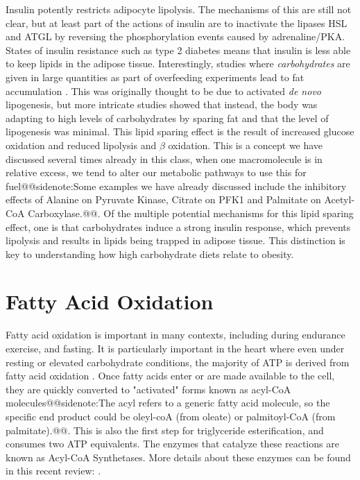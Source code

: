 \documentclass{tufte-handout}
\makeatletter
\def\sidenote#1{@@sidenote:#1@@}
\makeatother
\begin{document}
Insulin potently restricts adipocyte lipolysis.  The mechanisms of this are still not clear, but at least part of the actions of insulin are to inactivate the lipases HSL and ATGL by reversing the phosphorylation events caused by adrenaline/PKA.   States of insulin resistance such as type 2 diabetes means that insulin is less able to keep lipids in the adipose tissue.  Interestingly, studies where \emph{carbohydrates} are given in large quantities as part of overfeeding experiments lead to fat accumulation \citep{Acheson1988}.  This was originally thought to be due to activated \textit{de novo} lipogenesis, but more intricate studies showed that instead, the body was adapting to high levels of carbohydrates by sparing fat \citep{McDevitt2001} and that the level of lipogenesis was minimal.  This lipid sparing effect is the result of increased glucose oxidation and reduced lipolysis and $\beta$ oxidation.  This is a concept we have discussed several times already in this class, when one macromolecule is in relative excess, we tend to alter our metabolic pathways to use this for fuel\sidenote{Some examples we have already discussed include the inhibitory effects of Alanine on Pyruvate Kinase, Citrate on PFK1 and Palmitate on Acetyl-CoA Carboxylase.}.  Of the multiple potential mechanisms for this lipid sparing effect, one is that carbohydrates induce a strong insulin response, which prevents lipolysis and results in lipids being trapped in adipose tissue.  This distinction is key to understanding how high carbohydrate diets relate to obesity.

\section{Fatty Acid Oxidation}

Fatty acid oxidation is important in many contexts, including during endurance exercise, and fasting.  It is particularly important in the heart where even under resting or elevated carbohydrate conditions, the majority of ATP is derived from fatty acid oxidation \citep{Neeley1974}.  Once fatty acids enter or are made available to the cell, they are quickly converted to "activated" forms known as acyl-CoA molecules\sidenote{The acyl refers to a generic fatty acid molecule, so the specific end product could be oleyl-coA (from oleate) or palmitoyl-CoA (from palmitate).}.  This is also the first step for triglyceride esterification, and consumes two ATP equivalents.  The enzymes that catalyze these reactions are known as Acyl-CoA Synthetases.  More details about these enzymes can be found in this recent review: \citep{Grevengoed2014}.
\end{document}

